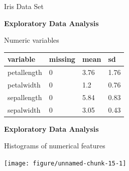 \documentclass[11pt,compress,t,notes=noshow, xcolor=table]{beamer}
\newenvironment{knitrout}{}{} %
\begin{document}
\begin{vbframe}{Iris Data Set}
\framebreak

\textbf{Exploratory Data Analysis}

Numeric variables

\begin{table}[H]
\centering\begingroup\fontsize{8}{10}\selectfont

\begin{tabular}{llll}
\toprule
variable & missing & mean & sd\\
\midrule
petallength & 0 & 3.76 & 1.76\\
petalwidth & 0 & 1.2 & 0.76\\
sepallength & 0 & 5.84 & 0.83\\
sepalwidth & 0 & 3.05 & 0.43\\
\bottomrule
\end{tabular}\endgroup{}
\end{table}



\framebreak

\textbf{Exploratory Data Analysis}

Histograms of numerical features

\begin{knitrout}\tiny
{}\color{fgcolor}

{\centering \texttt{[image: figure/unnamed-chunk-15-1]} 

}



\end{knitrout}



\end{vbframe}
\end{document}
